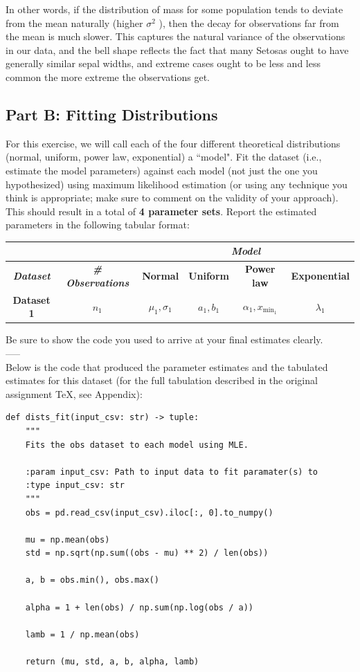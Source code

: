 In other words, if the distribution of mass for some population tends to deviate from the mean naturally (higher $ \sigma^2 $ ), then the decay for observations far from the mean is much slower. This captures the natural variance of the observations in our data, and the bell shape reflects the fact that many Setosas ought to have generally similar sepal widths, and extreme cases ought to be less and less common the more extreme the observations get.\\
\newpage

\subsection{Part B: Fitting Distributions}
For this exercise, we will call each of the four different theoretical distributions (normal, uniform, power law, exponential) a ``model". Fit the dataset (i.e., estimate the model parameters) against each model (not just the one you hypothesized) using maximum likelihood estimation (or using any technique you think is appropriate; make sure to comment on the validity of your approach). This should result in a total of \textbf{4 parameter sets}. Report the estimated parameters in the following tabular format:

\begin{center}
\begin{tabular}{|c|c|c|c|c|c|}
\hline
& & \multicolumn{4}{c|}{{\bf{\em{Model}}}}\\
\hline
{{\bf{\em{Dataset}}}} & {\bf{\em{\# Observations}}} &\textbf{Normal}& \textbf{Uniform} & \textbf{Power law} & \textbf{Exponential} \\
\hline
\textbf{Dataset 1} & $n_1$ &  $\mu_1, \sigma_1$ & $a_1, b_1$ & $\alpha_1, x_{\min_1}$ & $\lambda_1$ \\
\hline
\end{tabular}
\end{center}

Be sure to show the code you used to arrive at your final estimates clearly.\\
-----\\
Below is the code that produced the parameter estimates and the tabulated estimates for this dataset (for the full tabulation described in the original assignment TeX, see Appendix):

\begin{verbatim}
def dists_fit(input_csv: str) -> tuple:
    """
    Fits the obs dataset to each model using MLE.

    :param input_csv: Path to input data to fit paramater(s) to
    :type input_csv: str
    """
    obs = pd.read_csv(input_csv).iloc[:, 0].to_numpy()

    mu = np.mean(obs)
    std = np.sqrt(np.sum((obs - mu) ** 2) / len(obs))

    a, b = obs.min(), obs.max()

    alpha = 1 + len(obs) / np.sum(np.log(obs / a))

    lamb = 1 / np.mean(obs)

    return (mu, std, a, b, alpha, lamb)
\end{verbatim}

